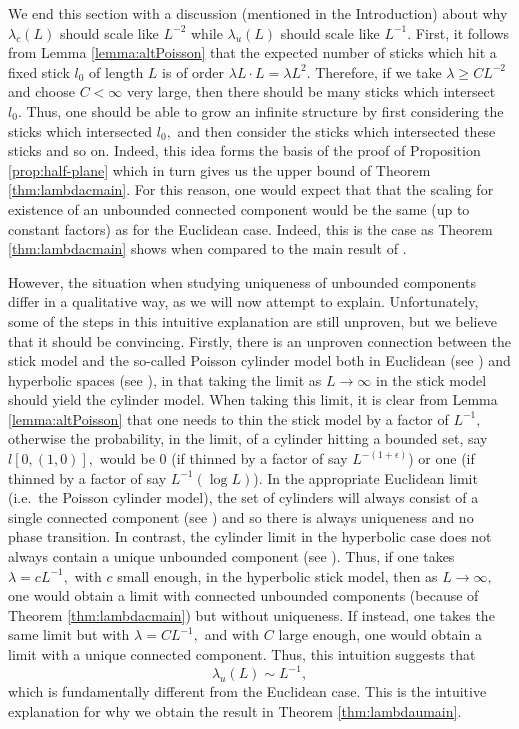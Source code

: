 \documentclass[a4paper,12pt]{article}
\begin{document}
\medskip
We end this section with a discussion (mentioned in the Introduction) about
why $\lambda_c(L)$ should scale like $L^{-2}$ while 
$\lambda_u(L)$ should scale like $L^{-1}.$ First, it follows from 
Lemma \ref{lemma:altPoisson}
that the expected number of sticks which hit a fixed stick $l_0$ of length $L$
is of order $\lambda L \cdot L=\lambda L^2.$  Therefore, if we take 
$\lambda \geq C L^{-2}$ and choose $C<\infty$ very large, then there should be 
many sticks which intersect $l_0.$ Thus, one should be able to grow an infinite 
structure by first considering the sticks which intersected $l_0,$ and then 
consider 
the sticks which intersected these sticks and so on. Indeed, this idea forms the 
basis of the proof of Proposition \ref{prop:half-plane} which in turn gives 
us the upper bound of Theorem \ref{thm:lambdacmain}.
For this reason, one would expect that 
that the scaling for existence of an unbounded connected component would be the same 
(up to constant factors) 
as for the Euclidean case. Indeed, this is the case as Theorem \ref{thm:lambdacmain} 
shows when compared to the main result of \cite{B_22}.

However, the situation when studying uniqueness of unbounded components 
differ in a qualitative way, as we will now attempt to explain. Unfortunately, some of the steps 
in this intuitive explanation are still unproven, but we believe that it should be convincing. 
Firstly, there is an unproven connection between the stick model and the so-called
Poisson cylinder model both in Euclidean (see \cite{BT_16}) and hyperbolic spaces
(see \cite{BT_15}), in that taking the limit as $L \to \infty$ in the stick model 
should yield the cylinder model. When taking this limit, it is clear from Lemma 
\ref{lemma:altPoisson} that one needs to thin the stick model by a factor of $L^{-1},$ 
otherwise the probability, in the limit, of a cylinder hitting a bounded set, say 
$l[0,(1,0)],$ would be 0 (if thinned 
by a factor of say $L^{-(1+\epsilon)}$) or one (if thinned by a factor of say 
$L^{-1} (\log L)$). 
In the appropriate 
Euclidean limit (i.e.\ the Poisson cylinder model), the set of cylinders will always consist  
of a single connected component (see \cite{BT_16})
and so there is always uniqueness and no phase transition.
In contrast, the cylinder limit in the hyperbolic case does not always contain a unique 
unbounded component (see \cite{BT_15}). Thus, if one
takes $\lambda=c L^{-1},$ with $c$ small enough, in the hyperbolic stick model, then as 
$L \to \infty,$ one would obtain a limit with connected unbounded components 
(because of Theorem \ref{thm:lambdacmain})
but without uniqueness. 
If instead, one takes the same limit but with  $\lambda=C L^{-1},$ and with $C$ large enough,
one would obtain a limit with a unique connected component. Thus, this intuition suggests that 
\[
\lambda_u(L)\sim L^{-1},
\]
which is fundamentally different from the Euclidean case. This is the intuitive explanation for why 
we obtain the result in Theorem \ref{thm:lambdaumain}.
\end{document}
